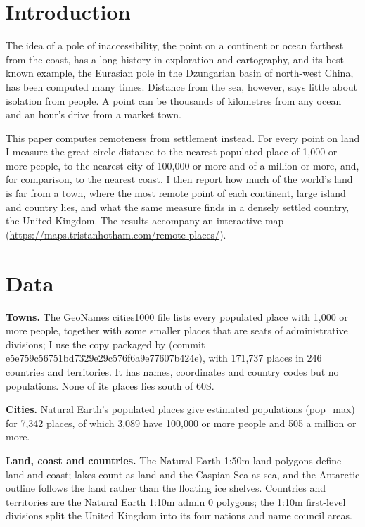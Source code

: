 \documentclass[11pt,a4paper]{article}
\begin{document}
\section{Introduction}
The idea of a pole of inaccessibility, the point on a continent or ocean farthest from the coast, has a long history in exploration and cartography, and its best known example, the Eurasian pole in the Dzungarian basin of north-west China, has been computed many times. Distance from the sea, however, says little about isolation from people. A point can be thousands of kilometres from any ocean and an hour's drive from a market town.

This paper computes remoteness from settlement instead. For every point on land I measure the great-circle distance to the nearest populated place of 1,000 or more people, to the nearest city of 100,000 or more and of a million or more, and, for comparison, to the nearest coast. I then report how much of the world's land is far from a town, where the most remote point of each continent, large island and country lies, and what the same measure finds in a densely settled country, the United Kingdom. The results accompany an interactive map (\url{https://maps.tristanhotham.com/remote-places/}).

\section{Data}
\textbf{Towns.} The GeoNames cities1000 file \citep{geonames} lists every populated place with 1,000 or more people, together with some smaller places that are seats of administrative divisions; I use the copy packaged by \citet{citiesjson} (commit e5e759c56751bd7329e29c576f6a9e77607b424e), with 171,737 places in 246 countries and territories. It has names, coordinates and country codes but no populations. None of its places lies south of 60\textdegree S.

\textbf{Cities.} Natural Earth's populated places \citep{naturalearth} give estimated populations (pop\_max) for 7,342 places, of which 3,089 have 100,000 or more people and 505 a million or more.

\textbf{Land, coast and countries.} The Natural Earth 1:50m land polygons define land and coast; lakes count as land and the Caspian Sea as sea, and the Antarctic outline follows the land rather than the floating ice shelves. Countries and territories are the Natural Earth 1:10m admin 0 polygons; the 1:10m first-level divisions split the United Kingdom into its four nations and name council areas.
\end{document}
